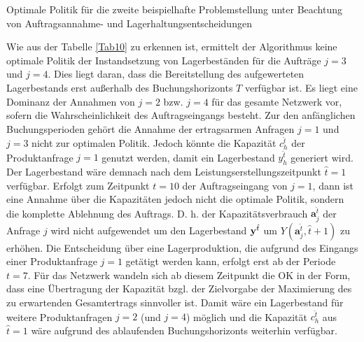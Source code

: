 \begin{table}
\renewcommand{\arraystretch}{1}
\begin{footnotesize}
     \caption{Optimale Politik für die zweite beispielhafte Problemstellung unter Beachtung von Auftragsannahme- und Lagerhaltungsentscheidungen} \label{Tab10}
        \begin{center}
      \end{center}
\end{footnotesize}
\end{table}

Wie aus der Tabelle \ref{Tab10} zu erkennen ist, ermittelt der Algorithmus keine optimale Politik der Instandsetzung von Lagerbeständen für die Aufträge $j=3$ und $j=4$. Dies liegt daran, dass die Bereitstellung des aufgewerteten Lagerbestands erst außerhalb des Buchungshorizonts $T$ verfügbar ist. Es liegt eine Dominanz der Annahmen von $j=2$ bzw. $j=4$ für das gesamte Netzwerk vor, sofern die Wahrscheinlichkeit des Auftragseingangs besteht. Zur den anfänglichen Buchungsperioden gehört die Annahme der ertragsarmen Anfragen $j=1$ und $j=3$ nicht zur optimalen Politik. Jedoch könnte die Kapazität $c_{h}^{\hat t}$ der Produktanfrage $j=1$ genutzt werden, damit ein Lagerbestand $y_{h}^{\hat t}$ generiert wird. Der Lagerbestand wäre demnach nach dem Leistungserstellungszeitpunkt $\hat{t}=1$ verfügbar. Erfolgt zum Zeitpunkt $t=10$ der Auftragseingang von $j=1$, dann ist eine Annahme über die Kapazitäten jedoch nicht die optimale Politik, sondern die komplette Ablehnung des Auftrags. D. h. der Kapazitätsverbrauch $\textbf{a}^{\hat t}_j$ der Anfrage $j$ wird nicht aufgewendet um den Lagerbestand $\textbf y^{\hat t}$ um $Y(\textbf{a}^{\hat t}_j,\hat t+1)$ zu erhöhen. Die Entscheidung über eine Lagerproduktion, die aufgrund des Eingangs einer Produktanfrage $j=1$ getätigt werden kann, erfolgt erst ab der Periode $t=7$. Für das Netzwerk wandeln sich ab diesem Zeitpunkt die OK in der Form, dass eine Übertragung der Kapazität bzgl. der Zielvorgabe der Maximierung des zu erwartenden Gesamtertrags sinnvoller ist. Damit wäre ein Lagerbestand für weitere Produktanfragen $j=2$ (und $j=4$) möglich und die Kapazität $c_{h}^{\hat t}$ aus $\hat{t}=1$ wäre aufgrund des ablaufenden Buchungshorizonts weiterhin verfügbar.\\[.5cm]


